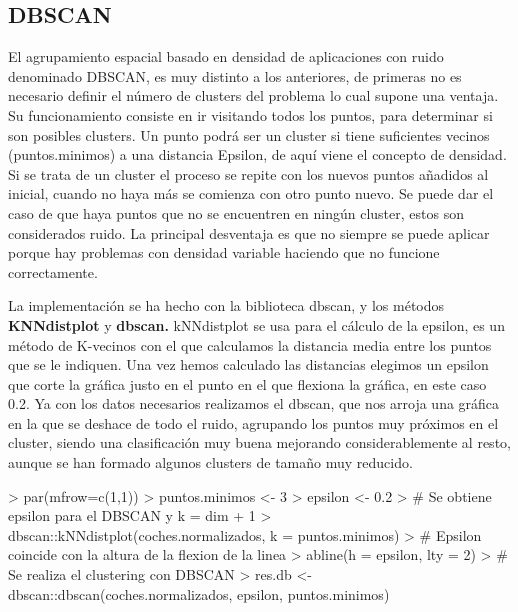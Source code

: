 \documentclass[a4paper]{article}
\begin{document}
\subsection{DBSCAN}
El agrupamiento espacial basado en densidad de aplicaciones con ruido denominado DBSCAN, es muy distinto a los anteriores, de primeras no es necesario definir el número de clusters del problema lo cual supone una ventaja. Su funcionamiento consiste en ir visitando todos los puntos, para determinar si son posibles clusters. Un punto podrá ser un cluster si tiene suficientes vecinos (puntos.minimos) a una distancia Epsilon, de aquí viene el concepto de densidad. Si se trata de un cluster el proceso se repite con los nuevos puntos añadidos al inicial, cuando no haya más se comienza con otro punto nuevo. Se puede dar el caso de que haya puntos que no se encuentren en ningún cluster, estos son considerados ruido. La principal desventaja es que no siempre se puede aplicar porque hay problemas con densidad variable haciendo que no funcione correctamente.

La implementación se ha hecho con la biblioteca dbscan, y los métodos \textbf{KNNdistplot} y \textbf{dbscan.} kNNdistplot se usa para el cálculo de la epsilon, es un método de K-vecinos con el que calculamos la distancia media entre los puntos que se le indiquen. Una vez hemos calculado las distancias elegimos un epsilon que corte la gráfica justo en el punto en el que flexiona la gráfica, en este caso 0.2. Ya con los datos necesarios realizamos el dbscan, que nos arroja una gráfica en la que se deshace de todo el ruido, agrupando los puntos muy próximos en el cluster, siendo una clasificación muy buena mejorando considerablemente al resto, aunque se han formado algunos clusters de tamaño muy reducido.
\begin{Schunk}
\begin{Sinput}
> par(mfrow=c(1,1))
> puntos.minimos <- 3
> epsilon <- 0.2
> # Se obtiene epsilon para el DBSCAN y k = dim + 1
> dbscan::kNNdistplot(coches.normalizados, k =  puntos.minimos)
> # Epsilon coincide con la altura de la flexion de la linea
> abline(h = epsilon, lty = 2)
> # Se realiza el clustering con DBSCAN
> res.db <- dbscan::dbscan(coches.normalizados, epsilon, puntos.minimos)
\end{Sinput}
\end{Schunk}
\end{document}
